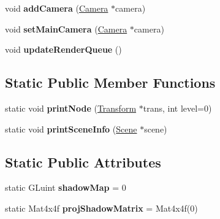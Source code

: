 \begin{DoxyCompactItemize}
\item 
\hypertarget{class_scene_a5cbb688a0217639bcc285c01fa005af9}{
void {\bfseries addCamera} (\hyperlink{class_camera}{Camera} $\ast$camera)}
\label{class_scene_a5cbb688a0217639bcc285c01fa005af9}

\item 
\hypertarget{class_scene_aa7a931a7e530c936433c3950c07f797e}{
void {\bfseries setMainCamera} (\hyperlink{class_camera}{Camera} $\ast$camera)}
\label{class_scene_aa7a931a7e530c936433c3950c07f797e}

\item 
\hypertarget{class_scene_a7da13a9b6cdc118cee47666ad164380d}{
void {\bfseries updateRenderQueue} ()}
\label{class_scene_a7da13a9b6cdc118cee47666ad164380d}

\end{DoxyCompactItemize}
\subsection*{Static Public Member Functions}
\begin{DoxyCompactItemize}
\item 
\hypertarget{class_scene_a18d706b52a631806605de9271f634cda}{
static void {\bfseries printNode} (\hyperlink{class_transform}{Transform} $\ast$trans, int level=0)}
\label{class_scene_a18d706b52a631806605de9271f634cda}

\item 
\hypertarget{class_scene_a0c564ec7ac34966a1cc1ceb0a4bf89ad}{
static void {\bfseries printSceneInfo} (\hyperlink{class_scene}{Scene} $\ast$scene)}
\label{class_scene_a0c564ec7ac34966a1cc1ceb0a4bf89ad}

\end{DoxyCompactItemize}
\subsection*{Static Public Attributes}
\begin{DoxyCompactItemize}
\item 
\hypertarget{class_scene_ae8c9fdb61e1c4575d04054bdd22465ff}{
static GLuint {\bfseries shadowMap} = 0}
\label{class_scene_ae8c9fdb61e1c4575d04054bdd22465ff}

\item 
\hypertarget{class_scene_a08b50d77587fb485b7a46dc4bd62002b}{
static Mat4x4f {\bfseries projShadowMatrix} = Mat4x4f(0)}
\label{class_scene_a08b50d77587fb485b7a46dc4bd62002b}

\end{DoxyCompactItemize}
